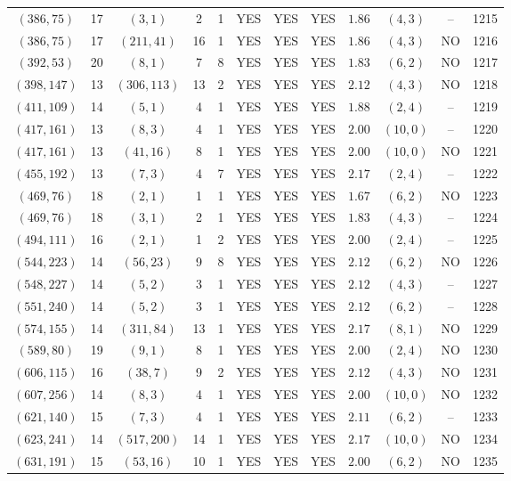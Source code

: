 \begin{longtable}{|c|c|c|c|c|c|c|c|c|c|c|c|}
$(386,75)$ & 17 & $(3,1)$ & 2 & 1 & YES & YES & YES & $1.86$ & $(4,3)$ & -- & 1215\\
$(386,75)$ & 17 & $(211,41)$ & 16 & 1 & YES & YES & YES & $1.86$ & $(4,3)$ & NO & 1216\\
$(392,53)$ & 20 & $(8,1)$ & 7 & 8 & YES & YES & YES & $1.83$ & $(6,2)$ & NO & 1217\\
$(398,147)$ & 13 & $(306,113)$ & 13 & 2 & YES & YES & YES & $2.12$ & $(4,3)$ & NO & 1218\\
$(411,109)$ & 14 & $(5,1)$ & 4 & 1 & YES & YES & YES & $1.88$ & $(2,4)$ & -- & 1219\\
$(417,161)$ & 13 & $(8,3)$ & 4 & 1 & YES & YES & YES & $2.00$ & $(10,0)$ & -- & 1220\\
$(417,161)$ & 13 & $(41,16)$ & 8 & 1 & YES & YES & YES & $2.00$ & $(10,0)$ & NO & 1221\\
$(455,192)$ & 13 & $(7,3)$ & 4 & 7 & YES & YES & YES & $2.17$ & $(2,4)$ & -- & 1222\\
$(469,76)$ & 18 & $(2,1)$ & 1 & 1 & YES & YES & YES & $1.67$ & $(6,2)$ & NO & 1223\\
$(469,76)$ & 18 & $(3,1)$ & 2 & 1 & YES & YES & YES & $1.83$ & $(4,3)$ & -- & 1224\\
$(494,111)$ & 16 & $(2,1)$ & 1 & 2 & YES & YES & YES & $2.00$ & $(2,4)$ & -- & 1225\\
$(544,223)$ & 14 & $(56,23)$ & 9 & 8 & YES & YES & YES & $2.12$ & $(6,2)$ & NO & 1226\\
$(548,227)$ & 14 & $(5,2)$ & 3 & 1 & YES & YES & YES & $2.12$ & $(4,3)$ & -- & 1227\\
$(551,240)$ & 14 & $(5,2)$ & 3 & 1 & YES & YES & YES & $2.12$ & $(6,2)$ & -- & 1228\\
$(574,155)$ & 14 & $(311,84)$ & 13 & 1 & YES & YES & YES & $2.17$ & $(8,1)$ & NO & 1229\\
$(589,80)$ & 19 & $(9,1)$ & 8 & 1 & YES & YES & YES & $2.00$ & $(2,4)$ & NO & 1230\\
$(606,115)$ & 16 & $(38,7)$ & 9 & 2 & YES & YES & YES & $2.12$ & $(4,3)$ & NO & 1231\\
$(607,256)$ & 14 & $(8,3)$ & 4 & 1 & YES & YES & YES & $2.00$ & $(10,0)$ & NO & 1232\\
$(621,140)$ & 15 & $(7,3)$ & 4 & 1 & YES & YES & YES & $2.11$ & $(6,2)$ & -- & 1233\\
$(623,241)$ & 14 & $(517,200)$ & 14 & 1 & YES & YES & YES & $2.17$ & $(10,0)$ & NO & 1234\\
$(631,191)$ & 15 & $(53,16)$ & 10 & 1 & YES & YES & YES & $2.00$ & $(6,2)$ & NO & 1235\\

\end{longtable}
